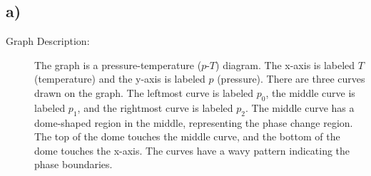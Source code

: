 

\subsection*{a)}

\begin{description}
    \item[Graph Description:] The graph is a pressure-temperature ($p$-$T$) diagram. The x-axis is labeled $T$ (temperature) and the y-axis is labeled $p$ (pressure). There are three curves drawn on the graph. The leftmost curve is labeled $p_0$, the middle curve is labeled $p_1$, and the rightmost curve is labeled $p_2$. The middle curve has a dome-shaped region in the middle, representing the phase change region. The top of the dome touches the middle curve, and the bottom of the dome touches the x-axis. The curves have a wavy pattern indicating the phase boundaries.
\end{description}